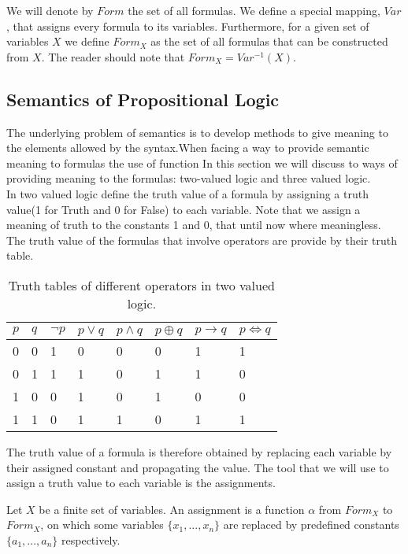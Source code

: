   We will denote by $Form$ the set of all formulas. We define a special mapping, $Var$, that assigns every formula to its variables. Furthermore, for a given set of variables $X$ we define $Form_{X}$ as the set of all formulas that can be constructed from $X$. The reader should note that $Form_X = Var^{-1}(X)$.


\subsection{Semantics of Propositional Logic}
The underlying problem of semantics is to develop methods to give meaning to the elements allowed by the syntax.When facing a way to provide semantic meaning to formulas the use of function In this section we will discuss to ways of providing meaning to the formulas: two-valued logic and three valued logic.\\ 



In two valued logic define the truth value of a formula by assigning a truth value(1 for Truth and 0 for False) to each variable. Note that we assign a meaning of truth to the constants 1 and 0, that until now where meaningless. The truth value of the formulas that involve operators are provide by their truth table.


\begin{table}[h]
  \begin{center}
    \begin{tabular}{|l|l|l|l|l|l|l|l|}
      \hline
      $p$ & $q$ & $\neg p$& $p\vee q$ & $p\wedge q$ & $p \oplus q$ & $p \to q $ & $p \iff q$  \\ 
      \hline
      0 & 0 & 1 & 0 & 0 & 0 & 1&1\\
      0 & 1 & 1 & 1 & 0 & 1 & 1&0\\
      1 & 0 & 0 & 1 & 0 & 1 & 0&0\\
      1 & 1 & 0 & 1 & 1 & 0 & 1&1\\\hline
    \end{tabular}
  \end{center}
  \caption{\label{tab:table-name}Truth tables of different operators in two valued logic.}
\end{table}


The truth value of a formula is therefore obtained by replacing each variable by their assigned constant and propagating the value. The tool that we will use to assign a truth value to each variable is the assignments.

\begin{definition}
  Let $X$ be a finite set of variables. An assignment is a function $\alpha$ from $Form_X$ to $Form_X$, on which some variables $\{x_1,...,x_n \}$ are replaced by predefined constants $\{a_1,...,a_n\}$ respectively.\\
\end{definition}


